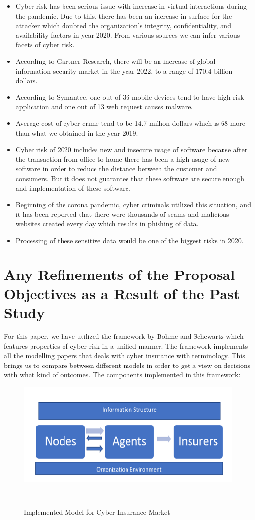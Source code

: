 \documentclass[conference]{IEEEtran}
\begin{document}
\begin{itemize}
\begin{itemize}
\item Cyber risk has been serious issue with increase in virtual interactions during the pandemic. Due to this, there has been an increase in surface for the attacker which doubted the organization’s integrity, confidentiality, and availability factors in year 2020. From various sources we can infer various facets of cyber risk. 
\item According to Gartner Research, there will be an increase of global information security market in the year 2022, to a range of 170.4 billion dollars\cite{b17}.
\item According to Symantec, one out of 36 mobile devices tend to have high risk application and one out of 13 web request causes malware\cite{b18}.
\item	Average cost of cyber crime tend to be 14.7 million dollars which is 68 more than what we obtained in the year 2019\cite{b19}. 
\item	Cyber risk of 2020 includes new and insecure usage of software because after the transaction from office to home there has been a high usage of new software in order to reduce the distance between the customer and consumers. But it does not guarantee that these software are secure enough and implementation of these software. 
\item Beginning of the corona pandemic, cyber criminals utilized this situation, and it has been reported that there were thousands of scams and malicious websites created every day which results in phishing of data.  
\item Processing of these sensitive data would be one of the biggest risks in 2020. 
\end{itemize}
\end{itemize}
\section{Any Refinements of the Proposal Objectives as a Result of the Past Study}
For this paper, we have utilized the framework by Bohme and Schewartz which features properties of cyber risk in a unified manner. The framework implements all the modelling papers that deals with cyber insurance with terminology. This brings us to compare between different models in order to get a view on decisions with what kind of outcomes.
The components implemented in this framework: 

\begin{figure}
\centering
  \includegraphics[width=0.9\columnwidth]{fig3.png}
  \caption{Implemented Model for Cyber Insurance Market}~\label{fig:figure2}
\end{figure}
\end{document}
